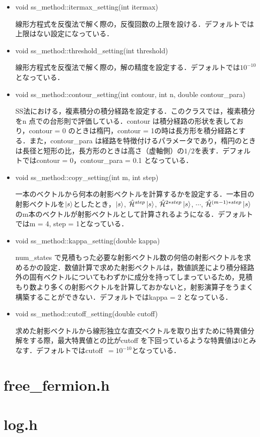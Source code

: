 \documentclass[report, 11pt, uplatex]{jsbook}
\newcommand{\hami}{{\mathcal{\hat{H}}}}
\begin{document}
\begin{itemize}
		\item void ss\_method::itermax\_setting(int itermax)
		
		線形方程式を反復法で解く際の，反復回数の上限を設ける．デフォルトでは上限はない設定になっている．
		
		\item void ss\_method::threshold\_setting(int threshold)
		
		線形方程式を反復法で解く際の，解の精度を設定する．デフォルトでは$10^{-10}$となっている．
		
		\item void ss\_method::contour\_setting(int contour, int n, double contour\_para)
		
		SS法における，複素積分の積分経路を設定する．このクラスでは，複素積分をn 点での台形則で評価している．contour は積分経路の形状を表しており，contour = 0 のときは楕円，contour = 1の時は長方形を積分経路とする．また，contour\_para は経路を特徴付けるパラメータであり，楕円のときは長径と短形の比，長方形のときは高さ（虚軸側）の$1/2$を表す．デフォルトではcontour = 0，contour\_para = 0.1 となっている．
		
		
		\item void ss\_method::copy\_setting(int m, int step)
		
		一本のベクトルから何本の射影ベクトルを計算するかを設定する．一本目の射影ベクトルを$\ket{s}$としたとき，$\ket{s}$, $\hami^{step}\ket{s}$, $\hami^{2*step}\ket{s}$, $\cdots$, $\hami^{(m-1)*step}\ket{s}$のm本のベクトルが射影ベクトルとして計算されるようになる．デフォルトではm = 4, step = 1となっている．
		
		\item void ss\_method::kappa\_setting(double kappa)
		
		num\_states で見積もった必要な射影ベクトル数の何倍の射影ベクトルを求めるかの設定．数値計算で求めた射影ベクトルは，数値誤差により積分経路外の固有ベクトルについてもわずかに成分を持ってしまっているため，見積もり数より多くの射影ベクトルを計算しておかないと，射影演算子をうまく構築することができない．デフォルトではkappa = 2 となっている．
		
		\item void ss\_method::cutoff\_setting(double cutoff)
		
		求めた射影ベクトルから線形独立な直交ベクトルを取り出すために特異値分解をする際，最大特異値との比がcutoff を下回っているような特異値は$0$とみなす．デフォルトではcutoff~$= 10^{-10}$となっている．
		
		
		
	\end{itemize}
	
	
	
	\section{free\_fermion.h}
	
	\section{log.h}
	
\end{document}
